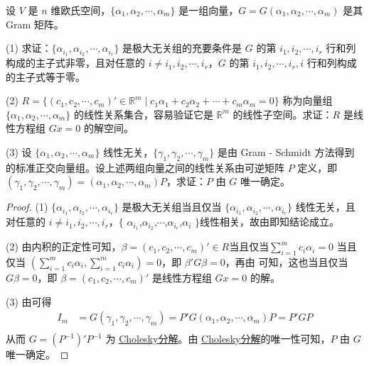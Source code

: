 \documentclass[../../main.tex]{subfiles}
\begin{document}
\begin{proposition}\label{proposition:例9.36}
设 \(V\) 是 \(n\) 维欧氏空间，\(\{\alpha_1,\alpha_2,\cdots,\alpha_m\}\) 是一组向量，\(G = G(\alpha_1,\alpha_2,\cdots,\alpha_m)\) 是其 Gram 矩阵。

(1) 求证：\(\{\alpha_{i_1},\alpha_{i_2},\cdots,\alpha_{i_r}\}\) 是极大无关组的充要条件是 \(G\) 的第 \(i_1,i_2,\cdots,i_r\) 行和列构成的主子式非零，且对任意的 \(i\neq i_1,i_2,\cdots,i_r\)，\(G\) 的第 \(i_1,i_2,\cdots,i_r,i\) 行和列构成的主子式等于零。

(2) \(R = \{(c_1,c_2,\cdots,c_m)'\in\mathbb{R}^m\mid c_1\alpha_1 + c_2\alpha_2 + \cdots + c_m\alpha_m = 0\}\) 称为向量组 \(\{\alpha_1,\alpha_2,\cdots,\alpha_m\}\) 的线性关系集合，容易验证它是 \(\mathbb{R}^m\) 的线性子空间。求证：\(R\) 是线性方程组 \(Gx = 0\) 的解空间。

(3) 设 \(\{\alpha_1,\alpha_2,\cdots,\alpha_m\}\) 线性无关，\(\{\gamma_1,\gamma_2,\cdots,\gamma_m\}\) 是由 Gram - Schmidt 方法得到的标准正交向量组。设上述两组向量之间的线性关系由可逆矩阵 \(P\) 定义，即 \((\gamma_1,\gamma_2,\cdots,\gamma_m)=(\alpha_1,\alpha_2,\cdots,\alpha_m)P\)，求证：\(P\) 由 \(G\) 唯一确定。
\end{proposition}
\begin{proof}
(1) \(\{\alpha_{i_1},\alpha_{i_2},\cdots,\alpha_{i_r}\}\) 是极大无关组当且仅当 \(\{\alpha_{i_1},\alpha_{i_2},\cdots,\alpha_{i_r}\}\) 线性无关，且对任意的 $i\neq i_1,i_2,\cdots,i_r$，$\{$ $\alpha_{i_1}$,$\alpha_{i_2}$,$\cdots$,$\alpha_{i_r}$,$\alpha_i$ $\}$线性相关，故由即知结论成立。

(2) 由内积的正定性可知，\(\beta=(c_1,c_2,\cdots,c_m)'\in R\)当且仅当$\sum_{i = 1}^{m}c_i\alpha_i=0$ 当且仅当 \((\sum_{i = 1}^{m}c_i\alpha_i,\sum_{i = 1}^{m}c_i\alpha_i)=0\)，即 \(\beta'G\beta = 0\)，再由 可知，这也当且仅当 \(G\beta = 0\)，即 \(\beta=(c_1,c_2,\cdots,c_m)'\) 是线性方程组 \(Gx = 0\) 的解。 

(3) 由可得
\begin{align*}
I_m &= G(\gamma_1,\gamma_2,\cdots,\gamma_m)=P'G(\alpha_1,\alpha_2,\cdots,\alpha_m)P = P'GP\\
\end{align*}
从而 \(G=(P^{-1})'P^{-1}\) 为 \hyperref[proposition:正定阵的3个充要条件]{Cholesky分解}。由 \hyperref[proposition:正定阵的3个充要条件]{Cholesky分解}的唯一性可知，\(P\) 由 \(G\) 唯一确定。
\end{proof}
\end{document}
